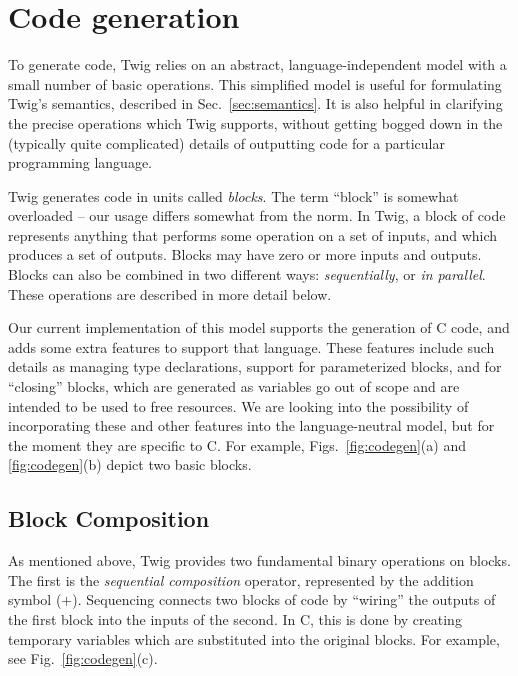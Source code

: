 
\section{Code generation}
\label{sec:code-gen}

To generate code, Twig relies on an abstract, language-independent model with a small number of basic operations. This simplified model is useful for formulating Twig's semantics, described in Sec.~\ref{sec:semantics}. It is also helpful in clarifying the precise operations which Twig supports, without getting bogged down in the (typically quite complicated) details of outputting code for a particular programming language.

Twig generates code in units called \emph{blocks}. The term ``block'' is somewhat overloaded -- our usage differs somewhat from the norm. In Twig, a block of code represents anything that performs some operation on a set of inputs, and which produces a set of outputs. Blocks may have zero or more inputs and outputs. Blocks can also be combined in two different ways: \emph{sequentially}, or \emph{in parallel}. These operations are described in more detail below.

Our current implementation of this model supports the generation of C code, and adds some extra features to support that language. These features include such details as managing type declarations, support for parameterized blocks, and for ``closing'' blocks, which are generated as variables go out of scope and are intended to be used to free resources. We are looking into the possibility of incorporating these and other features into the language-neutral model, but for the moment they are specific to C. For example, Figs.~\ref{fig:codegen}(a) and \ref{fig:codegen}(b) depict two basic blocks.

\subsection{Block Composition}

As mentioned above, Twig provides two fundamental binary operations on blocks. The first is the \emph{sequential composition} operator, represented by the addition symbol ($+$). Sequencing connects two blocks of code by ``wiring'' the outputs of the first block into the inputs of the second. In C, this is done by creating temporary variables which are substituted into the original blocks. For example, see Fig.~\ref{fig:codegen}(c).

